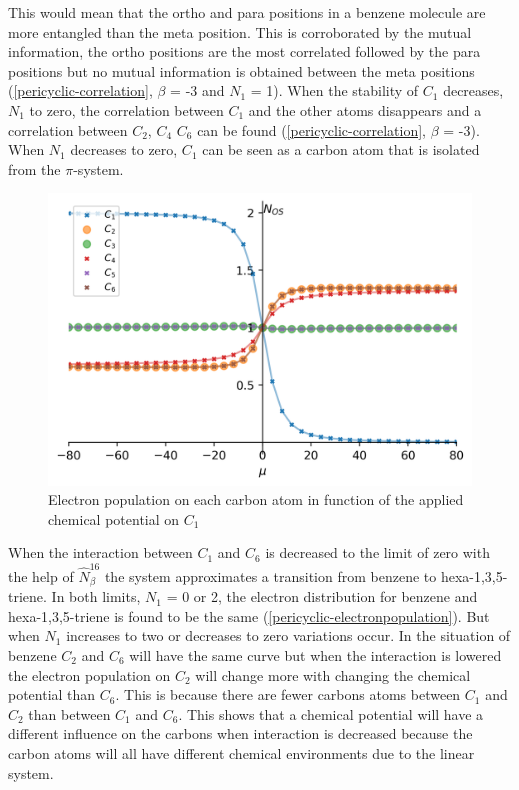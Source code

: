 \documentclass[twoside,twocolumn,9pt]{article}
\begin{document}
  This would mean that the ortho and para positions in a benzene molecule are more entangled than the meta position. This is corroborated by the mutual information, the ortho positions are the most correlated followed by the para positions but no mutual information is obtained between the meta positions (\cref{pericyclic-correlation}, $\beta$ = -3 and $N_1$ = 1). When the stability of $C_1$ decreases, $N_1$ to zero, the correlation between $C_1$ and the other atoms disappears and a correlation between $C_2$, $C_4$ $C_6$ can be found (\cref{pericyclic-correlation}, $\beta$ = -3). When $N_1$ decreases to zero, $C_1$ can be seen as a carbon atom that is isolated from the $\pi$-system. 

  \begin{center}
    \begin{figure}[H]
        \includegraphics[width=\linewidth]
        {chemical-potential-on-1-carbon-electronpopulation-better.png}
        \caption{Electron population on each carbon atom in function of the applied chemical potential on $C_1$}
        \label{chemical-potential-on-1-carbon-electronpopulation}
    \end{figure}
  \end{center}

  When the interaction between $C_1$ and $C_6$ is decreased to the limit of zero with the help of $\hat{N}_{\beta}^{16}$ the system approximates a transition from benzene to hexa-1,3,5-triene. In both limits, $N_1$ = 0 or 2, the electron distribution for benzene and hexa-1,3,5-triene is found to be the same (\cref{pericyclic-electronpopulation}). But when $N_1$ increases to two or decreases to zero variations occur. In the situation of benzene $C_2$ and $C_6$ will have the same curve but when the interaction is lowered the electron population on $C_2$ will change more with changing the chemical potential than $C_6$. This is because there are fewer carbons atoms between $C_1$ and $C_2$ than between $C_1$ and $C_6$. This shows that a chemical potential will have a different influence on the carbons when interaction is decreased because the carbon atoms will all have different chemical environments due to the linear system.   
\end{document}
